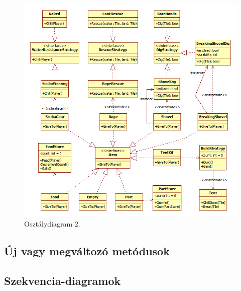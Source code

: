\begin{figure}[H]
	\begin{center}
		\includegraphics[width=17cm]{chapters/chapter07/ClassDiagramPart2.png}
		\caption{Osztálydiagram 2.}
		\label{fig:OsztalyDiagramPart2}
	\end{center}
\end{figure}

\subsection{Új vagy megváltozó metódusok}


\subsection{Szekvencia-diagramok}


